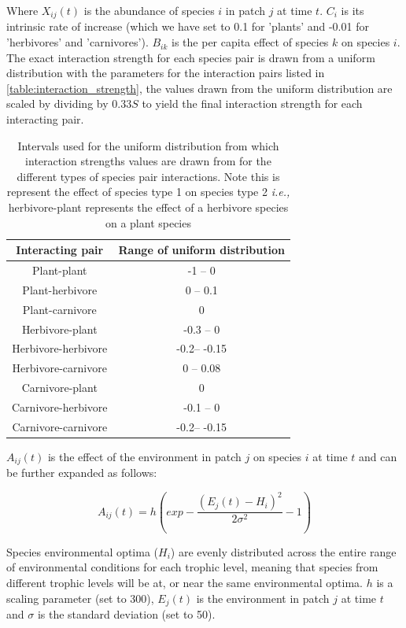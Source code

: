 \begin{refsection}
Where $X_{ij}(t)$ is the abundance of species $i$ in patch $j$ at time $t$. $C_i$
is its intrinsic rate of increase (which we have set to 0.1 for 'plants' and
-0.01 for 'herbivores' and 'carnivores'). $B_{ik}$ is the per capita effect of
species $k$ on species $i$. The exact interaction strength for each species pair
is drawn from a uniform distribution with the parameters for the 
interaction pairs listed in \autoref{table:interaction_strength}, the values
drawn from the uniform distribution are scaled by dividing by $0.33S$ to yield
the final interaction strength for each interacting pair.

\begin{table}[h!]
\centering
\begin{tabular}{||c c||} 
 \hline
Interacting pair & Range of uniform distribution \\ [0.5ex] \hline\hline
 Plant-plant & -1 -- 0 \\ 
 Plant-herbivore & 0 -- 0.1 \\
 Plant-carnivore & 0 \\
 Herbivore-plant & -0.3 -- 0 \\
 Herbivore-herbivore & -0.2-- -0.15 \\
 Herbivore-carnivore & 0 -- 0.08 \\
 Carnivore-plant & 0  \\
 Carnivore-herbivore & -0.1 -- 0  \\
 Carnivore-carnivore & -0.2-- -0.15 \\ [1ex] 
 \hline
\end{tabular}
\caption{Intervals used for the uniform distribution from which interaction
strengths values are drawn from for the different types of species pair
interactions. Note this is represent the effect of species type 1 on species
type 2 \emph{i.e.,} herbivore-plant represents the effect of a herbivore species on a plant species}
\label{table:interaction_strength}
\end{table}

$A_{ij}(t)$ is the effect of the environment in patch $j$ on species $i$ at time $t$ and can be further expanded as follows:  

\begin{equation} \label{eq:metacomm_env}
A_{ij}(t)=h\left(exp-\frac{(E_{j}(t)-H_{i})^2}{2\sigma^2}-1\right)
\end{equation}

Species environmental optima ($H_i$) are evenly distributed across the entire range of environmental conditions for each trophic level, meaning that species from different trophic levels will be at, or near the same environmental optima. $h$ is a scaling parameter (set to 300), $E_j(t)$ is the environment in patch $j$ at time $t$ and $\sigma$ is the standard deviation (set to 50).


\end{refsection}
